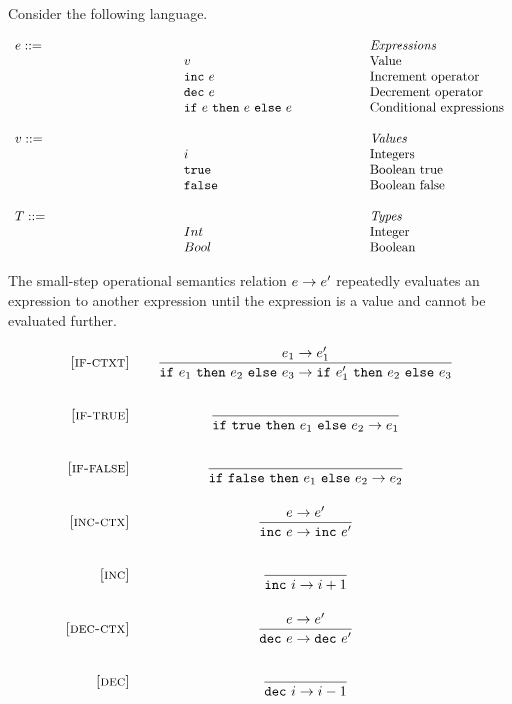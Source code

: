 \documentclass[addpoints]{exam}
\makeatletter
\newcommand{\mydefhead}[2]{\multicolumn{2}{l}{{#1}}&\mbox{\emph{#2}}\\}
\newcommand{\mydefcase}[2]{\qquad\qquad\qquad\qquad\qquad\qquad& #1 &\mbox{#2}\\}
\newcommand{\rel}[1]{ \mbox{\sc [#1]} }
\newcommand{\sstep}[2]{{#1} \rightarrow {#2}}
\newcommand{\ssrule}[3]{
  \rel{#1} &
  \frac{\strut\begin{array}{@{}c@{}} #2 \end{array}}
       {\strut\begin{array}{@{}c@{}} #3 \end{array}}
   \\~\\
}
\makeatother
\begin{document}
\begin{questions}

  \question[15]
  Consider the following language.

\newcommand{\incexp}[1]{\mbox{\tt inc}~{#1}}
\newcommand{\decexp}[1]{\mbox{\tt dec}~{#1}}
\newcommand{\ifexp}[3]{\mbox{\tt if}~{#1}~{\tt then}~{#2}~{\tt else}~{#3}}
\newcommand{\ttrue}{\mbox{\tt true}}
\newcommand{\ffalse}{\mbox{\tt false}}

\[
  \begin{array}{ll@{\qquad\qquad\qquad}l}
  \mydefhead{e ::=}{Expressions}
    \mydefcase{v}{Value}
    \mydefcase{\incexp{e}}{Increment operator}
    \mydefcase{\decexp{e}}{Decrement operator}
    \mydefcase{\ifexp{e}{e}{e}}{Conditional expressions}
  \\
    \mydefhead{v ::=\qquad\qquad\qquad\qquad}{Values}
    \mydefcase{i}{Integers}
    \mydefcase{\ttrue}{Boolean true}
    \mydefcase{\ffalse}{Boolean false}
  \\
    \mydefhead{T ::=\qquad\qquad\qquad\qquad}{Types}
    \mydefcase{Int}{Integer}
    \mydefcase{Bool}{Boolean}
\end{array}
\]

The small-step operational semantics relation
$\large \sstep{e}{e'} $
  repeatedly evaluates an expression to another expression
until the expression is a value and cannot be evaluated further.

\[
  \begin{array}{r@{\qquad}c}

    \ssrule{if-ctxt}{
      \sstep{e_1}{e_1'} \\
    }{
      \sstep{\ifexp{e_1}{e_2}{e_3}}{\ifexp{e_1'}{e_2}{e_3}}
    }

    \ssrule{if-true}{
    }{
      \sstep{\ifexp{\ttrue}{e_1}{e_2}}{e_1}
    }

    \ssrule{if-false}{
    }{
      \sstep{\ifexp{\ffalse}{e_1}{e_2}}{e_2}
    }

    \ssrule{inc-ctx}{
      \sstep{e}{e'} \\
    }{
      \sstep{\incexp{e}}{\incexp{e'}}
    }

    \ssrule{inc}{
    }{
      \sstep{\incexp{i}}{i+1}
    }

    \ssrule{dec-ctx}{
      \sstep{e}{e'} \\
    }{
      \sstep{\decexp{e}}{\decexp{e'}}
    }

    \ssrule{dec}{
    }{
      \sstep{\decexp{i}}{i-1}
    }


\end{array}\]
\end{questions}
\end{document}
